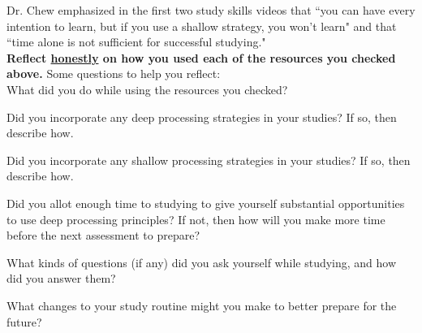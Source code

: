 \documentclass[10pt]{article}
\begin{document}
\begin{enumerate}
Dr. Chew emphasized in the first two study skills videos that ``you can have every intention to learn, but if you use a shallow strategy, you won't learn" and that ``time alone is not sufficient for successful studying." \\

{\bf Reflect \underline{honestly} on how you used each of the resources you checked above.} Some questions to help you reflect:\\[0.05in] 
%
What did you do while using the resources you checked? 

\vfill

Did you incorporate any deep processing strategies in your studies? If so, then describe how. 

\vfill

Did you incorporate any shallow processing strategies in your studies? If so, then describe how.

\vfill

Did you allot enough time to studying to give yourself substantial opportunities to use deep processing principles? If not, then how will you make more time before the next assessment to prepare?

\vfill

What kinds of questions (if any) did you ask yourself while studying, and how did you answer them?

\vfill

What changes to your study routine might you make to better prepare for the future? 

\vfill

\newpage










\end{enumerate}
\end{document}

